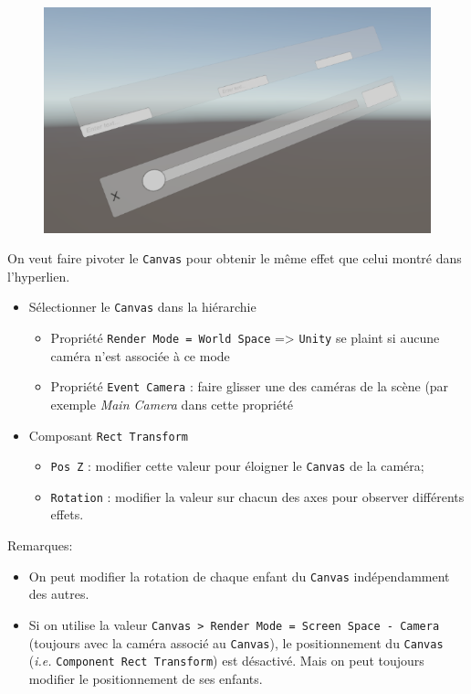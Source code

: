 \documentclass[a4paper,10pt]{article}
\newenvironment{solution}%
{\begin{tcolorbox}[breakable,colback=red!5!white,colframe=red!75!black,title=Solution]}%
{\end{tcolorbox}}
\begin{document}
	\begin{figure}
		\begin{centering}
			\includegraphics[width=0.7\linewidth]{fig/oriented-canvas}

		\end{centering}	
	\end{figure}


\ifversionenseignant
\begin{solution}
On veut faire pivoter le \texttt{Canvas} pour obtenir le même effet que celui montré dans l'hyperlien. 

\begin{itemize}
	\item Sélectionner le \texttt{Canvas} dans la hiérarchie
	\begin{itemize}
		\item Propriété \texttt{Render Mode = World Space} => \texttt{Unity} se plaint si aucune caméra n'est associée à ce mode
		\item Propriété \texttt{Event Camera} : faire glisser une des caméras de la scène (par exemple \textit{Main Camera} dans cette propriété
\end{itemize}		
	\item Composant \texttt{Rect Transform}
	\begin{itemize}	
	\item \texttt{Pos Z} : modifier cette valeur pour éloigner le \texttt{Canvas} de la caméra;
	\item \texttt{Rotation} : modifier la valeur sur chacun des axes pour observer différents effets.
\end{itemize}		
\end{itemize}

Remarques:
	\begin{itemize}	
	 \item On peut modifier la rotation de chaque enfant du \texttt{Canvas} indépendamment des autres.
	 \item Si on utilise la valeur \texttt{Canvas > Render Mode = Screen Space - Camera} (toujours avec la caméra associé au \texttt{Canvas}), le positionnement du \texttt{Canvas} (\textit{i.e.} \texttt{Component Rect Transform}) est désactivé. Mais on peut toujours modifier le positionnement de ses enfants.
	
\end{itemize}


\end{solution}
\fi 
\end{document}
